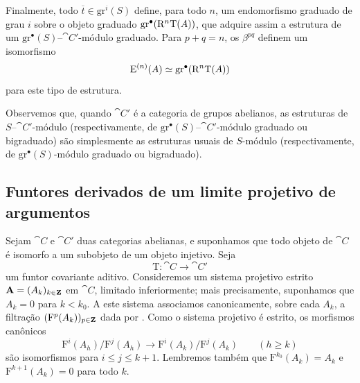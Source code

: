 \begin{env}[13.6.6]
Finalmente, todo $\overline{t}\in\mathrm{gr}^i(S)$ define, para todo
$n$, um endomorfismo graduado de grau $i$ sobre o objeto graduado
$\mathrm{gr}^\bullet(\mathrm{R}^n\mathrm{T}(A))$, que adquire assim a
estrutura de um
$\mathrm{gr}^\bullet(S)$--$\cat{C}'$-módulo graduado.
Para $p+q=n$, os $\beta^{pq}$ definem um isomorfismo
\[
  \mathrm{E}^{(n)}(A)
  \simeq
  \mathrm{gr}^\bullet(\mathrm{R}^n\mathrm{T}(A))
\]
para este tipo de estrutura.

Observemos que, quando $\cat{C}'$ é a categoria de grupos abelianos, as
estruturas de $S$--$\cat{C}'$-módulo (respectivamente, de
$\mathrm{gr}^\bullet(S)$--$\cat{C}'$-módulo graduado ou bigraduado) são
simplesmente as estruturas usuais de $S$-módulo (respectivamente, de
$\mathrm{gr}^\bullet(S)$-módulo graduado ou bigraduado).
\end{env}

\subsection{Funtores derivados de um limite projetivo de argumentos}
\label{subsection:0.13.7}
\label{0.13.7}

\begin{env}[13.7.1]
\label{0.13.7.1}
Sejam $\cat{C}$ e $\cat{C}'$ duas categorias abelianas, e suponhamos
que todo objeto de $\cat{C}$ é isomorfo a um subobjeto de um
objeto injetivo.
Seja
\[
  \mathrm{T}:\cat{C}\longrightarrow\cat{C}'
\]
um funtor covariante aditivo.
Consideremos um sistema projetivo estrito
$\mathbf{A}=(A_k)_{k\in\mathbf{Z}}$ em $\cat{C}$, limitado inferiormente; mais
precisamente, suponhamos que $A_k=0$ para $k<k_0$.
A este sistema associamos canonicamente, sobre cada $A_k$, a
filtração $(\mathrm{F}^p(A_k))_{p\in\mathbf{Z}}$ dada por
.
Como o sistema projetivo é estrito, os morfismos canônicos
\begin{equation}
\label{0.13.7.1.1}
\tag{13.7.1.1}
  \mathrm{F}^i(A_h)/\mathrm{F}^j(A_h)
  \longrightarrow
  \mathrm{F}^i(A_k)/\mathrm{F}^j(A_k)
  \qquad(h\geq k)
\end{equation}
são isomorfismos para $i\leq j\leq k+1$.
Lembremos também que
$\mathrm{F}^{k_0}(A_k)=A_k$ e
$\mathrm{F}^{k+1}(A_k)=0$ para todo $k$.
\end{env}

